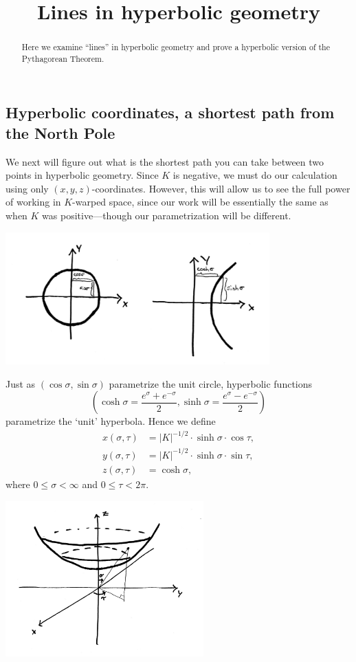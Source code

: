 \documentclass[newpage,hints,handout]{ximera}
\title{Lines in hyperbolic geometry}
\begin{document}
\begin{abstract}
Here we examine ``lines'' in hyperbolic geometry and prove a
hyperbolic version of the Pythagorean Theorem.
\end{abstract}
\maketitle

\subsection*{Hyperbolic coordinates, a shortest path from the North Pole}

We next will figure out what is the shortest path you can take between
two points in hyperbolic geometry. Since $K$ is negative, we must do
our calculation using only $(x,y,z)$-coordinates. However, this will
allow us to see the full power of working in $K$-warped space, since
our work will be essentially the same as when $K$ was positive---though
our parametrization will be different.
\begin{image}
\includegraphics[width=4in]{trigVsHyp.jpg}
\end{image}


Just as $(\cos\sigma,\sin\sigma)$ parametrize the unit circle,
hyperbolic functions
\[
\left(
\cosh\sigma=\frac{e^{\sigma}+e^{-\sigma}}{2},
\sinh\sigma=\frac{e^{\sigma}-e^{-\sigma}}{2}
\right)
\]
parametrize the `unit' hyperbola. Hence we define
\begin{align*}
  x(\sigma,\tau) &=|K|^{-1/2}\cdot \sinh \sigma\cdot\cos \tau,\\
  y(\sigma,\tau) &=|K|^{-1/2}\cdot\sinh\sigma\cdot\sin \tau,\\
  z(\sigma,\tau) &=\cosh \sigma,
\end{align*}
where $0\le \sigma< \infty$ and $0\le \tau<2\pi$.

\begin{image}
  \includegraphics[width=3in]{hyperbolicPara.jpg}
\end{image}
\end{document}
